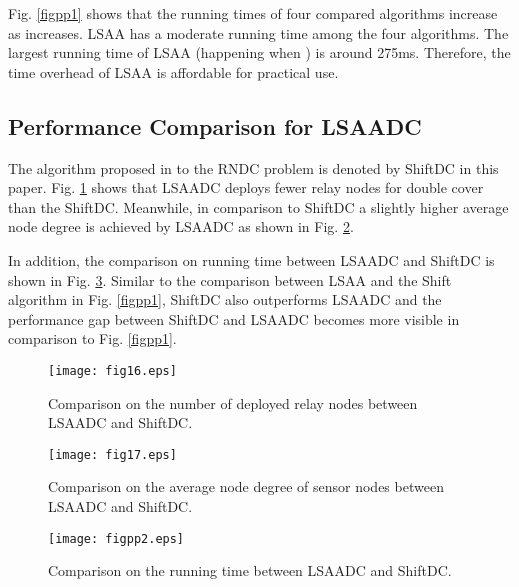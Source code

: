 \documentclass[journal]{IEEEtran}
\begin{document}
Fig. \ref{figpp1} shows that the running times of four compared algorithms increase as  increases. LSAA has a moderate running time among the four algorithms. The largest running time of LSAA (happening when ) is around 275ms. Therefore, the time overhead of LSAA is affordable for practical use. \subsection{Performance Comparison for LSAADC}
The algorithm proposed in \cite{Tang06} to the RNDC problem is denoted by ShiftDC in this paper. Fig. \ref{fig16} shows that LSAADC deploys fewer relay nodes for double cover than the ShiftDC. Meanwhile, in comparison to ShiftDC a slightly higher average node degree is achieved by LSAADC as shown in Fig. \ref{fig17}.

In addition, the comparison on running time between LSAADC and ShiftDC is shown in Fig. \ref{figpp2}. Similar to the comparison between LSAA and the Shift algorithm in Fig. \ref{figpp1}, ShiftDC also outperforms LSAADC and the performance gap between ShiftDC and LSAADC becomes more visible in comparison to Fig. \ref{figpp1}.

\begin{figure}
\begin{center}
\texttt{[image: fig16.eps]}    \caption{Comparison on the number of deployed relay nodes between LSAADC and ShiftDC.}
\label{fig16}                                 \end{center}                                 \end{figure}

\begin{figure}
\begin{center}
\texttt{[image: fig17.eps]}    \caption{Comparison on the average node degree of sensor nodes between LSAADC and ShiftDC.}
\label{fig17}                                 \end{center}                                 \end{figure}

 \begin{figure}
\begin{center}
\texttt{[image: figpp2.eps]}    \caption{Comparison on the running time between LSAADC and ShiftDC.}
\label{figpp2}                                 \end{center}                                 \end{figure}
\end{document}
